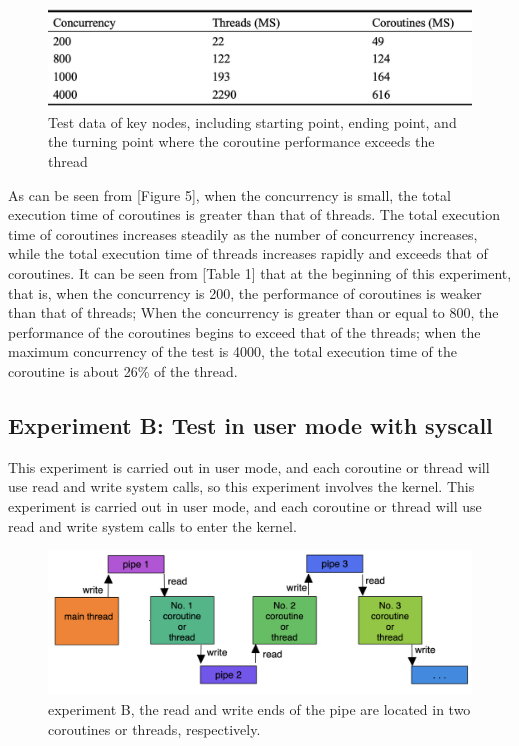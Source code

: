 \documentclass[10pt]{article}
\begin{document}
\begin{figure}[ht]
\begin{center}
\centerline{\includegraphics[width=\columnwidth]{user_table.png}}
\caption{Test data of key nodes, including starting point, ending point, and the turning point where the coroutine performance exceeds the thread}
\label{user_table}
\end{center}
\end{figure}

As can be seen from [Figure 5], when the concurrency is small, the total execution time of coroutines is greater than that of threads. The total execution time of coroutines increases steadily as the number of concurrency increases, while the total execution time of threads increases rapidly and exceeds that of coroutines. It can be seen from [Table 1] that at the beginning of this experiment, that is, when the concurrency is 200, the performance of coroutines is weaker than that of threads; When the concurrency is greater than or equal to 800, the performance of the coroutines begins to exceed that of the threads; when the maximum concurrency of the test is 4000, the total execution time of the coroutine is about 26\% of the thread.

\subsection{Experiment B: Test in user mode with syscall}

This experiment is carried out in user mode, and each coroutine or thread will use read and write system calls, so this experiment involves the kernel. This experiment is carried out in user mode, and each coroutine or thread will use read and write system calls to enter the kernel. 

\begin{figure}[ht]
\begin{center}
\centerline{\includegraphics[width=\columnwidth]{test2.png}}
\caption{experiment B, the read and write ends of the pipe are located in two coroutines or threads, respectively.}
\label{test2}
\end{center}
\end{figure}
\end{document}
